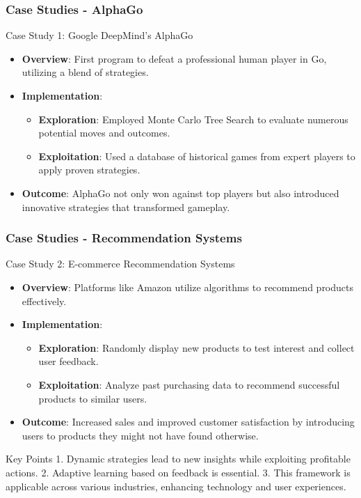 \documentclass[aspectratio=169]{beamer}
\begin{document}
\begin{frame}[fragile]
    \frametitle{Case Studies - AlphaGo}
    \begin{block}{Case Study 1: Google DeepMind's AlphaGo}
        \begin{itemize}
            \item \textbf{Overview}: First program to defeat a professional human player in Go, utilizing a blend of strategies.
            \item \textbf{Implementation}:
                \begin{itemize}
                    \item \textbf{Exploration}: Employed Monte Carlo Tree Search to evaluate numerous potential moves and outcomes.
                    \item \textbf{Exploitation}: Used a database of historical games from expert players to apply proven strategies.
                \end{itemize}
            \item \textbf{Outcome}: AlphaGo not only won against top players but also introduced innovative strategies that transformed gameplay.
        \end{itemize}
    \end{block}
\end{frame}

\begin{frame}[fragile]
    \frametitle{Case Studies - Recommendation Systems}
    \begin{block}{Case Study 2: E-commerce Recommendation Systems}
        \begin{itemize}
            \item \textbf{Overview}: Platforms like Amazon utilize algorithms to recommend products effectively.
            \item \textbf{Implementation}:
                \begin{itemize}
                    \item \textbf{Exploration}: Randomly display new products to test interest and collect user feedback.
                    \item \textbf{Exploitation}: Analyze past purchasing data to recommend successful products to similar users.
                \end{itemize}
            \item \textbf{Outcome}: Increased sales and improved customer satisfaction by introducing users to products they might not have found otherwise.
        \end{itemize}
    \end{block}
    
    \begin{block}{Key Points}
        1. Dynamic strategies lead to new insights while exploiting profitable actions. 
        2. Adaptive learning based on feedback is essential.
        3. This framework is applicable across various industries, enhancing technology and user experiences.
    \end{block}
\end{frame}
\end{document}
